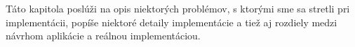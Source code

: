 Táto kapitola poslúži na opis niektorých problémov, s ktorými sme sa stretli pri implementácii, popíše niektoré detaily implementácie a tiež aj rozdiely medzi návrhom aplikácie a reálnou implementáciou.